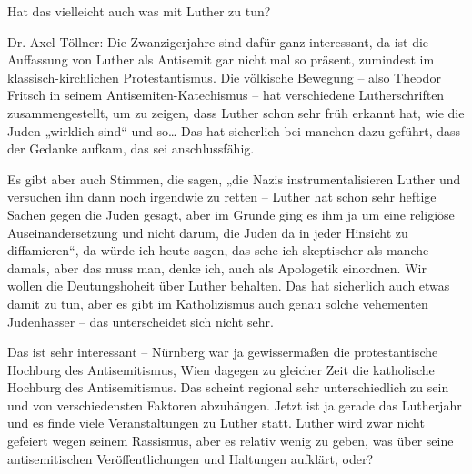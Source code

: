 Hat das vielleicht auch was mit Luther zu tun? 

Dr. Axel Töllner: Die Zwanzigerjahre sind dafür ganz interessant, da ist die Auffassung von Luther als Antisemit gar nicht mal so präsent, zumindest im klassisch-kirchlichen Protestantismus.  
Die völkische Bewegung – also Theodor Fritsch in seinem Antisemiten-Katechismus – hat verschiedene Lutherschriften zusammengestellt, um zu zeigen, dass Luther schon sehr früh erkannt hat, wie die Juden „wirklich sind“ und so… Das hat sicherlich bei manchen dazu geführt, dass der Gedanke aufkam, das sei anschlussfähig.  

Es gibt aber auch Stimmen, die sagen, „die Nazis instrumentalisieren Luther und versuchen ihn dann noch irgendwie zu retten – Luther hat schon sehr heftige Sachen gegen die Juden gesagt, aber im Grunde ging es ihm ja um eine religiöse Auseinandersetzung und nicht darum, die Juden da in jeder Hinsicht zu diffamieren“, da würde ich heute sagen, das sehe ich skeptischer als manche damals, aber das muss man, denke ich, auch als Apologetik einordnen. Wir wollen die Deutungshoheit über Luther behalten. Das hat sicherlich auch etwas damit zu tun, aber es gibt im Katholizismus auch genau solche vehementen Judenhasser – das unterscheidet sich nicht sehr. 

Das ist sehr interessant – Nürnberg war ja gewissermaßen die protestantische Hochburg des Antisemitismus, Wien dagegen zu gleicher Zeit die katholische Hochburg des Antisemitismus. Das scheint regional sehr unterschiedlich zu sein und von verschiedensten Faktoren abzuhängen. 
Jetzt ist ja gerade das Lutherjahr und es finde viele Veranstaltungen zu Luther statt. Luther wird zwar nicht gefeiert wegen seinem Rassismus, aber es relativ wenig zu geben, was über seine antisemitischen Veröffentlichungen und Haltungen aufklärt, oder?  

